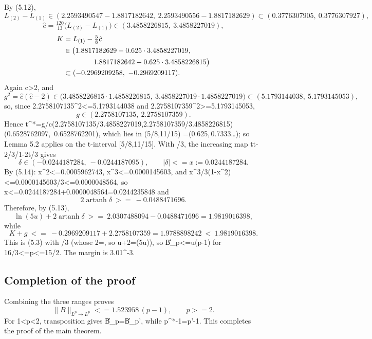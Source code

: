 \documentclass[10pt,reqno]{amsart}
\def\({}\def\){}%
\def\frac#1#2{#1/#2}%
\def\ge{>=}\def\le{<=}%
\theoremstyle{definition}
\theoremstyle{remark}
\begin{document}
By (5.12), \[L_{(2)}-L_{(1)}\in(2.2593490547-1.8817182642,\ 2.2593490556-1.8817182629)
\subset(0.3776307905,\ 0.3776307927),\] \[\hat c=\tfrac{120}{13}\big(L_{(2)}-L_{(1)}\big)\in(3.4858226815,\ 3.4858227019),\] \[
\begin{aligned}
K&=L_{(1)}-\tfrac58\hat c\\
 &\in\bigl(1.8817182629-0.625\cdot3.4858227019,\\
 &\hspace{4.2em}1.8817182642-0.625\cdot3.4858226815\bigr)\\
 &\subset(-0.2969209258,\ -0.2969209117).
\end{aligned}
\] Again \(\hat c>2\), and \[g^2=\hat c(\hat c-2)\in\big(3.4858226815\cdot1.4858226815,\
3.4858227019\cdot1.4858227019\big)\subset(5.1793144038,\ 5.1793145053),\] so, since \(2.2758107135^2\le5.1793144038\) and \(2.2758107359^2\ge5.1793145053\), \[g\in(2.2758107135,\ 2.2758107359).\] Hence \(t^*=g/\hat c\in\big(\frac{2.2758107135}{3.4858227019},\frac{2.2758107359}{3.4858226815}\big)
\subset(0.6528762097,\ 0.6528762201)\), which lies in \((\frac58,\frac{11}{15})
=(0.625,\,0.7333\ldots)\); so Lemma 5.2 applies on the \(t\)-interval \([\frac58,\frac{11}{15}]\). With \(\beta=\frac23\), the increasing map \(t\mapsto\frac{t-2/3}{1-2t/3}\) gives \[\delta\in(-0.0244187284,\ -0.0244187095),\qquad |\delta|\le x:=0.0244187284 .\] By (5.14): \(x^2\le0.0005962743\), \(x^3\le0.0000145603\), and \(\frac{x^3}{3(1-x^2)}\le\frac{0.0000145603}{3}\le0.0000048564\), so \(x\le0.0244187284+0.0000048564=0.0244235848\) and \[2\delta\ \ge\ -0.0488471696 .\] Therefore, by (5.13), \[\ln(5u)+2\operatorname{artanh}\delta\ \ge\ 2.0307488094-0.0488471696=1.9819016398,\] while \[K+g\ \le\ -0.2969209117+2.2758107359=1.9788898242\ <\ 1.9819016398 .\] This is (5.3) with \(\beta=\frac23\) (whose \(2\operatorname{artanh}\beta=\), so \(\ln u+2\beta=\ln(5u)\)), so \(\|B\|_p\le u(p-1)\) for \(\frac{16}3\le p\le\frac{15}2\). The margin is \(3.01^{-3}\).

\subsection{Completion of the proof}\label{subsec:completion}

Combining the three ranges proves
\[\|B\|_{L^p\to L^p}\le1.523958\,(p-1),\qquad p\ge2.\]
For \(1<p<2\), transposition gives \(\|B\|_p=\|B\|_{p'}\), while
\(p^*-1=p'-1\).  This completes the proof of the main theorem.
\end{document}
